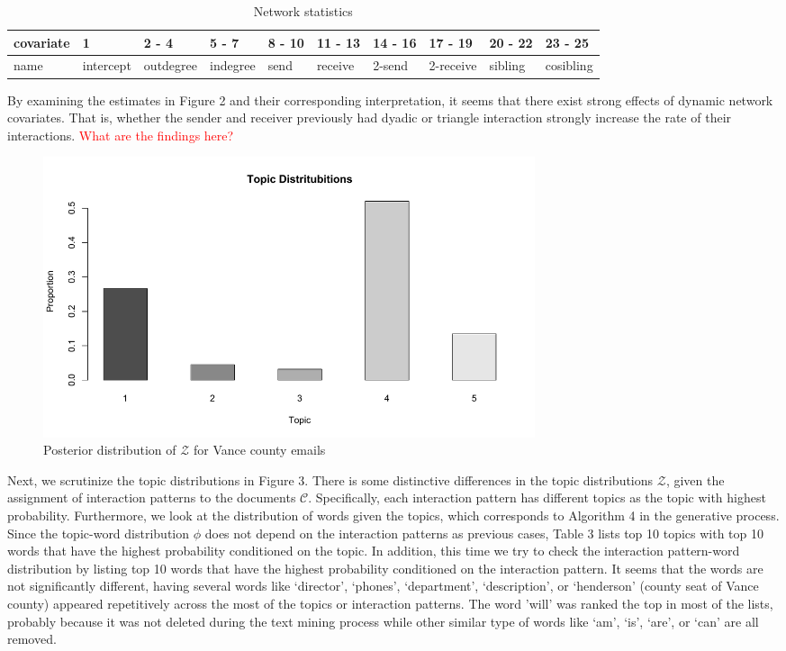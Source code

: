 \documentclass[a4paper]{article}
\begin{document}
 \begin{table}[ht]
 	\centering
 	\begin{tabular}{|l|l|l|l|l|l|l|l|l|l|}
 		\hline
 		covariate & 1&2 - 4&5 - 7& 8 - 10 & 11 - 13 & 14 - 16& 17 - 19 & 20 - 22&23 - 25\\
 	\hline	name & intercept & outdegree & indegree & send & receive & 2-send & 2-receive & sibling & cosibling\\
 	 		\hline
 	\end{tabular}
 	\caption {Network statistics}
 \end{table}
 \normalsize
By examining the estimates in Figure 2 and their corresponding interpretation, it seems that there exist strong effects of dynamic network covariates. That is, whether the sender and receiver previously had dyadic or triangle interaction strongly increase the rate of their interactions. \textcolor{red}{What are the findings here?}\newpage
 \begin{figure}[ht]
 	\centering
 		\includegraphics[width=0.7\textwidth]{topicplot.pdf} 
 	\caption{Posterior distribution of $\mathcal{Z}$ for Vance county emails}
 	\label{fig:Vancebarplot}
 \end{figure} 
\noindent Next, we scrutinize the topic distributions in Figure 3. There is some distinctive differences in the topic distributions $\mathcal{Z}$, given the assignment of interaction patterns to the documents $\mathcal{C}$. Specifically, each interaction pattern has different topics as the topic with highest probability.
 \normalsize
 \newline
 Furthermore, we look at the distribution of words given the topics, which corresponds to Algorithm 4 in the generative process. Since the topic-word distribution $\phi$ does not depend on the interaction patterns as previous cases, Table 3 lists top 10 topics with top 10 words that have the highest probability conditioned on the topic. In addition, this time we try to check the interaction pattern-word distribution by listing top 10 words that have the highest probability conditioned on the interaction pattern. It seems that the words are not significantly different, having several words like `director', `phones', `department', `description', or `henderson' (county seat of Vance county) appeared repetitively across the most of the topics or interaction patterns. The word 'will' was ranked the top in most of the lists, probably because it was not deleted during the text mining process while other similar type of words like `am', `is', `are', or `can' are all removed. \\
\end{document}
